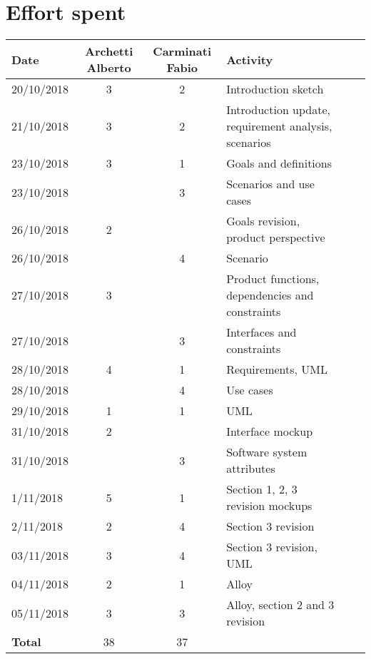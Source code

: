 
\section{Effort spent}

\label{sec:effort}

\begin{table}[h!]
\centering
\begin{tabularx}{\linewidth}{|l|c|c|X|Xl}
\hline
\textbf{Date}  & \textbf{Archetti Alberto} & \textbf{Carminati Fabio} & \textbf{Activity}                                \\
\hline
20/10/2018  & 3 & 2 & Introduction sketch                                             \\
\hline
21/10/2018 & 3 & 2 & Introduction update, requirement analysis, scenarios          \\
\hline
23/10/2018 & 3 & 1 & Goals and definitions                                             \\
 \hline
23/10/2018 & & 3 & Scenarios and use cases                                         \\
\hline
26/10/2018 & 2 & & Goals revision, product perspective          \\
\hline
26/10/2018 & & 4 & Scenario                                                         \\
 \hline
27/10/2018 & 3 & & Product functions, dependencies and constraints              \\
\hline
27/10/2018 & & 3 &Interfaces and constraints                                        \\
\hline
28/10/2018 & 4 & 1 & Requirements, UML                                               \\
 \hline
28/10/2018 & & 4 & Use cases                                                        \\
\hline
29/10/2018 &1 &1 &UML                                                             \\
\hline
31/10/2018 & 2 & & Interface mockup                                                \\
\hline
31/10/2018 & &3 & Software system attributes                                        \\
 \hline
1/11/2018 & 5 & 1& Section 1, 2, 3 revision mockups \\
 \hline
2/11/2018 & 2 & 4 &Section 3 revision                                                \\
\hline
03/11/2018 & 3 & 4 &Section 3 revision, UML                                       \\
\hline
04/11/2018 &2 & 1 &Alloy                                                             \\
\hline
05/11/2018 & 3 &3 &Alloy, section 2 and 3 revision       \\
\hline
\textbf{Total} & 38 &37 &       \\
\hline


\end{tabularx}

\end{table}

